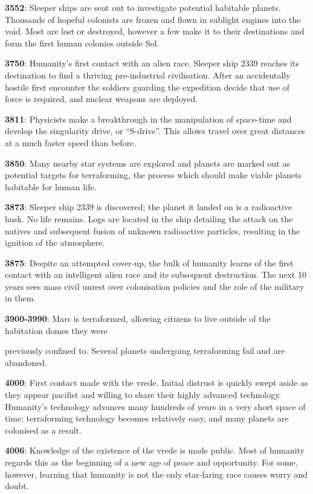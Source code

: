 \textbf{3552}: Sleeper ships are sent out to investigate potential habitable planets. Thousands of hopeful colonists are frozen and flown in sublight engines into the void. Most are lost or destroyed, however a few make it to their destinations and form the first human colonies outside Sol.

\textbf{3750}: Humanity's first contact with an alien race. Sleeper ship 2339 reaches its destination to find a thriving pre-industrial civilisation. After an accidentally hostile first encounter the soldiers guarding the expedition decide that use of force is required, and nuclear weapons are deployed.

\textbf{3811}: Physicists make a breakthrough in the manipulation of space-time and develop the singularity drive, or ``S-drive''. This allows travel over great distances at a much faster speed than before.

\textbf{3850}: Many nearby star systems are explored and planets are marked out as potential targets for terraforming, the process which should make viable planets habitable for human life.

\textbf{3873}: Sleeper ship 2339 is discovered; the planet it landed on is a radioactive husk. No life remains. Logs are located in the ship detailing the attack on the natives and subsequent fusion of unknown radioactive particles, resulting in the ignition of the atmosphere.

\textbf{3875}: Despite an attempted cover-up, the bulk of humanity learns of the first contact with an intelligent alien race and its subsequent destruction. The next 10 years sees mass civil unrest over colonisation policies and the role of the military in them.

\textbf{3900-3990}: Mars is terraformed, allowing citizens to live outside of the habitation domes they were

previously confined to. Several planets undergoing terraforming fail and are abandoned.

\textbf{4000}: First contact made with the vrede. Initial distrust is quickly swept aside as they appear pacifist and willing to share their highly advanced technology. Humanity's technology advances many hundreds of years in a very short space of time; terraforming technology becomes relatively easy, and many planets are colonised as a result.

\textbf{4006}: Knowledge of the existence of the vrede is made public. Most of humanity regards this as the beginning of a new age of peace and opportunity. For some, however, learning that humanity is not the only star-faring race causes worry and doubt.

